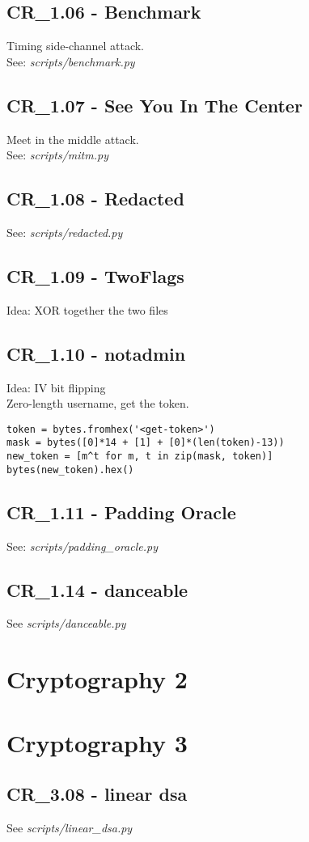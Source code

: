 \subsection{CR_1.06 - Benchmark}
Timing side-channel attack. \\
See: \textit{scripts/benchmark.py}

\subsection{CR_1.07 - See You In The Center}
Meet in the middle attack. \\
See: \textit{scripts/mitm.py}

\subsection{CR_1.08 - Redacted}
See: \textit{scripts/redacted.py}

\subsection{CR_1.09 - TwoFlags}
Idea: XOR together the two files

\subsection{CR_1.10 - notadmin}
Idea: IV bit flipping \\

Zero-length username, get the token.
\begin{verbatim}
token = bytes.fromhex('<get-token>')
mask = bytes([0]*14 + [1] + [0]*(len(token)-13))
new_token = [m^t for m, t in zip(mask, token)]
bytes(new_token).hex()
\end{verbatim}

\subsection{CR_1.11 - Padding Oracle}
See: \textit{scripts/padding_oracle.py}


\subsection{CR_1.14 - danceable}
See \textit{scripts/danceable.py}

\section{Cryptography 2}

\section{Cryptography 3}
\subsection{CR_3.08 - linear dsa}
See \textit{scripts/linear_dsa.py}